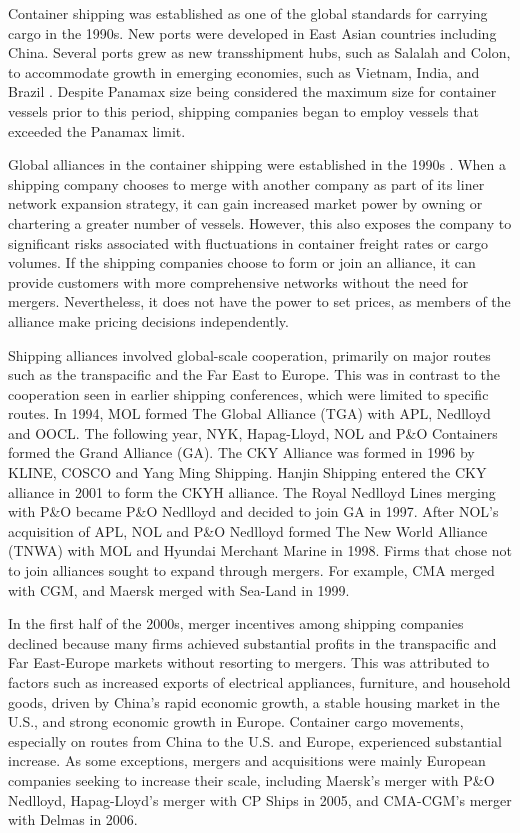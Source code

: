 \documentclass[10pt]{article}
\begin{document}
Container shipping was established as one of the global standards for carrying cargo in the 1990s. 
New ports were developed in East Asian countries including China. Several ports grew as new transshipment hubs, such as Salalah and Colon, to accommodate growth in emerging economies, such as Vietnam, India, and Brazil \citep{GUERRERO2014151}. Despite Panamax size being considered the maximum size for container vessels prior to this period, shipping companies began to employ vessels that exceeded the Panamax limit.

Global alliances in the container shipping were established in the 1990s \citep{Hirata2017}. 
When a shipping company chooses to merge with another company as part of its liner network expansion strategy, it can gain increased market power by owning or chartering a greater number of vessels. However, this also exposes the company to significant risks associated with fluctuations in container freight rates or cargo volumes. If the shipping companies choose to form or join an alliance, it can provide customers with more comprehensive networks without the need for mergers. Nevertheless, it does not have the power to set prices, as members of the alliance make pricing decisions independently.

Shipping alliances involved global-scale cooperation, primarily on major routes such as the transpacific and the Far East to Europe. 
This was in contrast to the cooperation seen in earlier shipping conferences, which were limited to specific routes.
In 1994, MOL formed The Global Alliance (TGA) with APL, Nedlloyd and OOCL.
The following year, NYK, Hapag-Lloyd, NOL and P\&O Containers formed the Grand Alliance (GA).
The CKY Alliance was formed in 1996 by KLINE, COSCO and Yang Ming Shipping. 
Hanjin Shipping entered the CKY alliance in 2001 to form the CKYH alliance.
The Royal Nedlloyd Lines merging with P\&O became P\&O Nedlloyd and decided to join GA in 1997.
After NOL's acquisition of APL, NOL and P\&O Nedlloyd formed The New World Alliance (TNWA) with MOL and Hyundai Merchant Marine in 1998.
Firms that chose not to join alliances sought to expand through mergers. For example, CMA merged with CGM, and Maersk merged with Sea-Land in 1999.

In the first half of the 2000s, merger incentives among shipping companies declined because many firms achieved substantial profits in the transpacific and Far East-Europe markets without resorting to mergers. This was attributed to factors such as increased exports of electrical appliances, furniture, and household goods, driven by China's rapid economic growth, a stable housing market in the U.S., and strong economic growth in Europe. 
Container cargo movements, especially on routes from China to the U.S. and Europe, experienced substantial increase.
As some exceptions, mergers and acquisitions were mainly European companies seeking to increase their scale, including Maersk's merger with P\&O Nedlloyd, Hapag-Lloyd's merger with CP Ships in 2005, and CMA-CGM's merger with Delmas in 2006.
\end{document}
